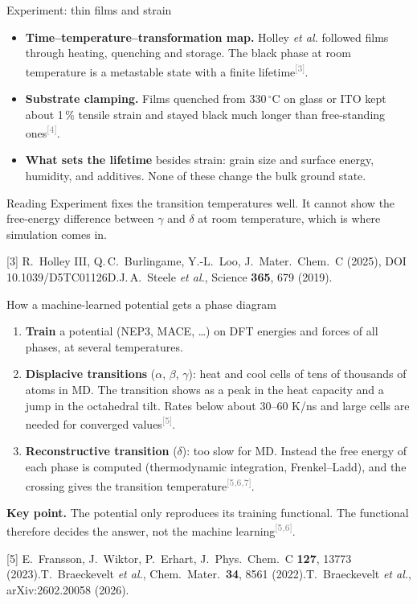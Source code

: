\documentclass[aspectratio=169,10pt]{beamer}
\newcommand{\cit}[1]{\textsuperscript{\textcolor{gray}{[#1]}}}
\newcommand{\refs}[1]{\par\vfill\begingroup\tiny\color{gray}\raggedright #1\par\endgroup}
\newcommand{\RC}{[3] R.~Holley III, Q.\,C.~Burlingame, Y.-L.~Loo, J.\ Mater.\ Chem.\ C (2025), DOI 10.1039/D5TC01126D.}
\newcommand{\RD}{[4] J.\,A.~Steele \emph{et al.}, Science \textbf{365}, 679 (2019).}
\newcommand{\RE}{[5] E.~Fransson, J.~Wiktor, P.~Erhart, J.\ Phys.\ Chem.\ C \textbf{127}, 13773 (2023).}
\newcommand{\RF}{[6] T.~Braeckevelt \emph{et al.}, Chem.\ Mater.\ \textbf{34}, 8561 (2022).}
\newcommand{\RG}{[7] T.~Braeckevelt \emph{et al.}, arXiv:2602.20058 (2026).}
\begin{document}
\begin{frame}{Experiment: thin films and strain}
  \small
  \begin{itemize}
    \item \textbf{Time--temperature--transformation map.} Holley \emph{et al.} followed films through heating, quenching and storage. The black phase at room temperature is a metastable state with a finite lifetime\cit{3}.
    \item \textbf{Substrate clamping.} Films quenched from 330\,$^\circ$C on glass or ITO kept about 1\,\% tensile strain and stayed black much longer than free-standing ones\cit{4}.
    \item \textbf{What sets the lifetime} besides strain: grain size and surface energy, humidity, and additives. None of these change the bulk ground state.
  \end{itemize}
  \begin{alertblock}{Reading}
    \small Experiment fixes the transition temperatures well. It cannot show the free-energy difference between $\gamma$ and $\delta$ at room temperature, which is where simulation comes in.
  \end{alertblock}
  \refs{\RC\quad \RD}
\end{frame}

\begin{frame}{How a machine-learned potential gets a phase diagram}
  \small
  \begin{enumerate}
    \item \textbf{Train} a potential (NEP3, MACE, \ldots) on DFT energies and forces of all phases, at several temperatures.
    \item \textbf{Displacive transitions} ($\alpha$, $\beta$, $\gamma$): heat and cool cells of tens of thousands of atoms in MD. The transition shows as a peak in the heat capacity and a jump in the octahedral tilt. Rates below about 30--60 K/ns and large cells are needed for converged values\cit{5}.
    \item \textbf{Reconstructive transition} ($\delta$): too slow for MD. Instead the free energy of each phase is computed (thermodynamic integration, Frenkel--Ladd), and the crossing gives the transition temperature\cit{5,6,7}.
  \end{enumerate}
  \vspace{0.3em}
  \textbf{Key point.} The potential only reproduces its training functional. The functional therefore decides the answer, not the machine learning\cit{5,6}.
  \refs{\RE\quad \RF\quad \RG}
\end{frame}
\end{document}
